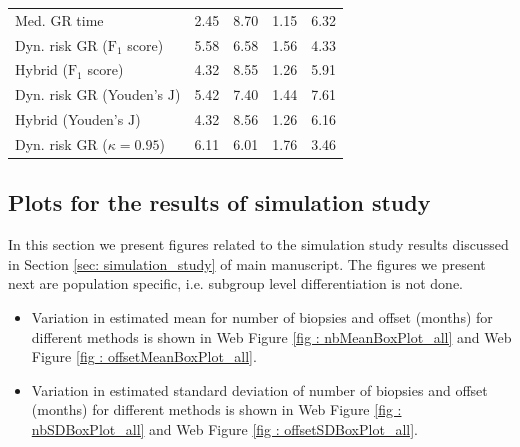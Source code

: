 \begin{table}[!htb]
\begin{tabular}{lrrrr}
Med. GR time & 2.45            & 8.70                & 1.15          & 6.32              \\
Dyn. risk GR ($\mbox{F}_1$ score)       & 5.58            & 6.58                & 1.56          & 4.33              \\
Hybrid ($\mbox{F}_1$ score)       & 4.32            & 8.55                & 1.26          & 5.91              \\
Dyn. risk GR (Youden's $\mbox{J}$)      & 5.42            & 7.40                & 1.44          & 7.61  \\        
Hybrid (Youden's $\mbox{J}$)   & 4.32            & 8.56                & 1.26          & 6.16              \\
Dyn. risk GR ($\kappa=0.95$) & 6.11 & 6.01 & 1.76 & 3.46\\
\hline     
\end{tabular}
\end{table}

\subsection{Plots for the results of simulation study}
In this section we present figures related to the simulation study results discussed in Section \ref{sec: simulation_study} of main manuscript. The figures we present next are population specific, i.e. subgroup level differentiation is not done.

\begin{itemize}
  \item Variation in estimated mean for number of biopsies and offset (months) for different methods is shown in Web Figure \ref{fig : nbMeanBoxPlot_all} and Web Figure \ref{fig : offsetMeanBoxPlot_all}.
  \item Variation in estimated standard deviation of number of biopsies and offset (months) for different methods is shown in Web Figure \ref{fig : nbSDBoxPlot_all} and Web Figure \ref{fig : offsetSDBoxPlot_all}.
\end{itemize}

